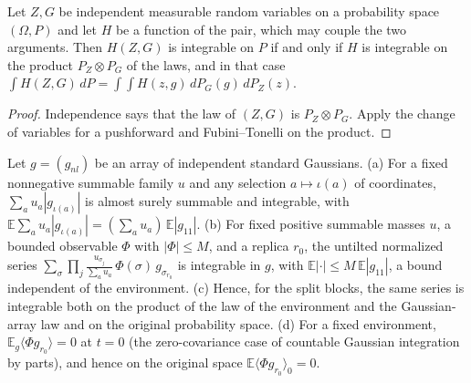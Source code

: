 \begin{lemma}\label{lem:sg:pd-fubini}
  \leanok
  Let $Z,G$ be independent measurable random variables on a probability space $(\Omega,P)$ and let $H$ be a function of the pair, which may couple the two arguments. Then $H(Z,G)$ is integrable on $P$ if and only if $H$ is integrable on the product $P_Z\otimes P_G$ of the laws, and in that case $\int H(Z,G)\,dP=\int\!\int H(z,g)\,dP_G(g)\,dP_Z(z)$.
\end{lemma}

\begin{proof}
  \leanok
Independence says that the law of $(Z,G)$ is $P_Z\otimes P_G$. Apply the change of variables for a pushforward and Fubini--Tonelli on the product.
\end{proof}

\begin{lemma}[Fixed-environment integrability, the untilted average, and its mean zero at $t=0$]\label{lem:sg:pd-untilted}
  \leanok
  Let $g=(g_{nl})$ be an array of independent standard Gaussians. (a) For a fixed nonnegative summable family $u$ and any selection $a\mapsto\iota(a)$ of coordinates, $\sum_au_a|g_{\iota(a)}|$ is almost surely summable and integrable, with $\mathbb E\sum_au_a|g_{\iota(a)}|=(\sum_au_a)\,\mathbb E|g_{11}|$. (b) For fixed positive summable masses $u$, a bounded observable $\Phi$ with $|\Phi|\le M$, and a replica $r_0$, the untilted normalized series $\sum_\sigma\prod_j\frac{u_{\sigma_j}}{\sum_au_a}\,\Phi(\sigma)\,g_{\sigma_{r_0}}$ is integrable in $g$, with $\mathbb E|\cdot|\le M\,\mathbb E|g_{11}|$, a bound independent of the environment. (c) Hence, for the split blocks, the same series is integrable both on the product of the law of the environment and the Gaussian-array law and on the original probability space. (d) For a fixed environment, $\mathbb E_g\langle\Phi g_{r_0}\rangle=0$ at $t=0$ (the zero-covariance case of countable Gaussian integration by parts), and hence on the original space $\mathbb E\langle \Phi g_{r_0}\rangle_0=0$.
\end{lemma}

